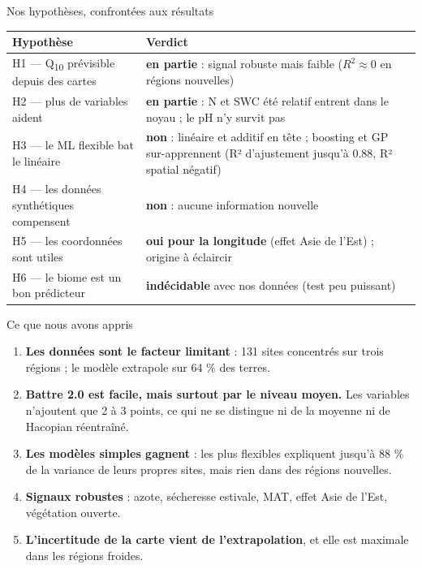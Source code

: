 \documentclass[aspectratio=169,10pt]{beamer}
\newcommand{\Qdix}{Q\textsubscript{10}}
\begin{document}
\begin{frame}{Nos hypothèses, confrontées aux résultats}
  \small
  \begin{tabular}{p{}p{}}
    \toprule
    Hypothèse & Verdict \\
    \midrule
    H1 --- \Qdix{} prévisible depuis des cartes & \textbf{en partie} : signal robuste mais faible ($R^2\approx0$ en régions nouvelles) \\
    H2 --- plus de variables aident & \textbf{en partie} : N et SWC été relatif entrent dans le noyau ; le pH n'y survit pas \\
    H3 --- le ML flexible bat le linéaire & \textcolor{rouge}{\textbf{non}} : linéaire et additif en tête ; boosting et GP sur-apprennent (R² d'ajustement jusqu'à 0.88, R² spatial négatif) \\
    H4 --- les données synthétiques compensent & \textcolor{rouge}{\textbf{non}} : aucune information nouvelle \\
    H5 --- les coordonnées sont utiles & \textbf{oui pour la longitude} (effet Asie de l'Est) ; origine à éclaircir \\
    H6 --- le biome est un bon prédicteur & \textbf{indécidable} avec nos données (test peu puissant) \\
    \bottomrule
  \end{tabular}
\end{frame}

\begin{frame}{Ce que nous avons appris}
  \begin{enumerate}
    \item \textbf{Les données sont le facteur limitant} : 131 sites concentrés sur trois régions ; le modèle extrapole sur 64 \% des terres.
    \item \textbf{Battre 2.0 est facile, mais surtout par le niveau moyen.} Les variables n'ajoutent que 2 à 3 points, ce qui ne se distingue ni de la moyenne ni de Hacopian réentraîné.
    \item \textbf{Les modèles simples gagnent} : les plus flexibles expliquent jusqu'à 88 \% de la variance de leurs propres sites, mais rien dans des régions nouvelles.
    \item \textbf{Signaux robustes} : azote, sécheresse estivale, MAT, effet Asie de l'Est, végétation ouverte.
    \item \textbf{L'incertitude de la carte vient de l'extrapolation}, et elle est maximale dans les régions froides.
  \end{enumerate}
\end{frame}
\end{document}
